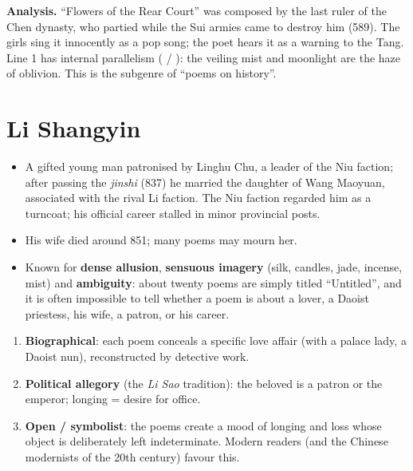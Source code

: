 \textbf{Analysis.} ``Flowers of the Rear Court'' was composed by the last ruler of the
Chen dynasty, who partied while the Sui armies came to destroy him (589). The girls sing
it innocently as a pop song; the poet hears it as a warning to the Tang. Line 1 has
internal parallelism ( / ): the veiling mist and moonlight are
the haze of oblivion. This is the subgenre of  ``poems on history''.

\section{Li Shangyin }

\begin{itemize}
  \item A gifted young man patronised by Linghu Chu, a leader of the Niu faction; after
        passing the \emph{jinshi} (837) he married the daughter of Wang Maoyuan, associated
        with the rival Li faction. The Niu faction regarded him as a turncoat; his
        official career stalled in minor provincial posts.
  \item His wife died around 851; many poems may mourn her.
  \item Known for \textbf{dense allusion}, \textbf{sensuous imagery} (silk, candles,
        jade, incense, mist) and \textbf{ambiguity}: about twenty poems are simply titled
         ``Untitled'', and it is often impossible to tell whether a poem is
        about a lover, a Daoist priestess, his wife, a patron, or his career.
\end{itemize}

\begin{important}
\begin{enumerate}
  \item \textbf{Biographical}: each poem conceals a specific love affair (with a palace
        lady, a Daoist nun), reconstructed by detective work.
  \item \textbf{Political allegory} (the \emph{Li Sao} tradition): the beloved is a patron or
        the emperor; longing = desire for office.
  \item \textbf{Open / symbolist}: the poems create a mood of longing and loss whose object
        is deliberately left indeterminate. Modern readers (and the Chinese modernists of
        the 20th century) favour this.
\end{enumerate}
\end{important}

